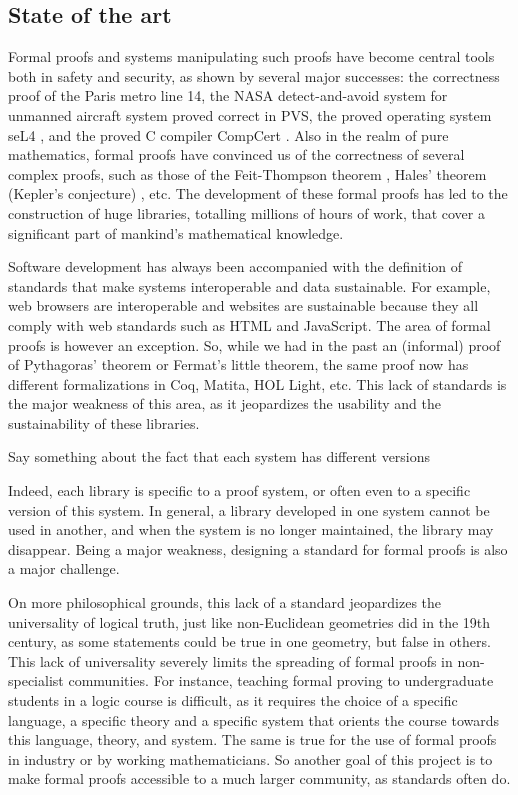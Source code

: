 \subsection{State of the art}

Formal proofs and systems manipulating such proofs have become central
tools both in safety and security, as shown by several major
successes: the correctness proof of the Paris metro line 14, the NASA
detect-and-avoid system for unmanned aircraft system proved correct in
PVS, the proved operating system seL4 \cite{Klein09}, and the proved C
compiler CompCert \cite{Leroy06}.  Also in the realm of pure
mathematics, formal proofs have convinced us of the correctness of
several complex proofs, such as those of the Feit-Thompson theorem
\cite{Gonthier13}, Hales' theorem (Kepler's conjecture)
\cite{Hales17}, etc.  The development of these formal proofs has led
to the construction of huge libraries, totalling millions of hours of
work, that cover a significant part of mankind's mathematical
knowledge.

Software development has always been accompanied with the definition
of standards that make systems interoperable and data sustainable. For
example, web browsers are interoperable and websites are sustainable
because they all comply with web standards such as HTML and
JavaScript. The area of formal proofs is however an exception. So,
while we had in the past an (informal) proof of Pythagoras' theorem or
Fermat's little theorem, the same proof now has different
formalizations in {\sc Coq}, {\sc Matita}, {\sc HOL Light}, etc. This
lack of standards is the major weakness of this area, as it
jeopardizes the usability and the sustainability of these
libraries.


{\color{red} Say something about the fact that each system has different
  versions}

Indeed, each library is specific to a proof system, or
often even to a specific version of this system. In general, a library
developed in one system cannot be used in another, and when the system
is no longer maintained, the library may disappear. Being a major
weakness, designing a standard for formal proofs is also a major
challenge.

On more philosophical grounds, this lack of a standard jeopardizes the
universality of logical truth, just like non-Euclidean geometries did
in the 19th century, as some statements could be true in one
geometry, but false in others.  This lack of universality severely
limits the spreading of formal proofs in non-specialist
communities. For instance, teaching formal proving to undergraduate
students in a logic course is difficult, as it requires the choice of
a specific language, a specific theory and a specific system that
orients the course towards this language, theory, and system. The same
is true for the use of formal proofs in industry or by working
mathematicians. So another goal of this project is to make formal
proofs accessible to a much larger community, as standards often do.

